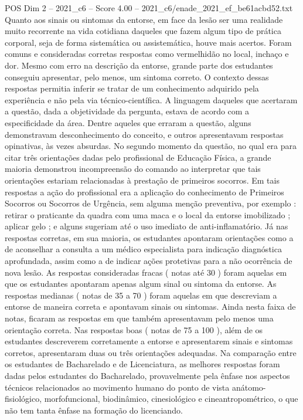 \begin{textsample}{POS Dim 2 – 2021\_c6 – Score 4.00 – 2021\_c6/enade\_2021\_ef\_be61acbd52.txt}
Quanto aos sinais ou sintomas da entorse, em face da lesão ser uma realidade muito recorrente na vida cotidiana daqueles que fazem algum tipo de prática corporal, seja de forma sistemática ou assistemática, houve mais acertos.
Foram comuns e consideradas corretas respostas como vermelhidão no local, inchaço e dor.
Mesmo com erro na descrição da entorse, grande parte dos estudantes conseguiu apresentar, pelo menos, um sintoma correto.
O contexto dessas respostas permitia inferir se tratar de um conhecimento adquirido pela experiência e não pela via técnico-científica.
A linguagem daqueles que acertaram a questão, dada a objetividade da pergunta, estava de acordo com a especificidade da área.
Dentre aqueles que erraram a questão, alguns demonstravam desconhecimento do conceito, e outros apresentavam respostas opinativas, às vezes absurdas.
No segundo momento da questão, no qual era para citar três orientações dadas pelo profissional de Educação Física, a grande maioria demonstrou incompreensão do comando ao interpretar que tais orientações estariam relacionadas à prestação de primeiros socorros.
Em tais respostas a ação do profissional era a aplicação do conhecimento de Primeiros Socorros ou Socorros de Urgência, sem alguma menção preventiva, por exemplo : retirar o praticante da quadra com uma maca e o local da entorse imobilizado ; aplicar gelo ; e alguns sugeriam até o uso imediato de anti-inflamatório.
Já nas respostas corretas, em sua maioria, os estudantes apontaram orientações como a de aconselhar a consulta a um médico especialista para indicação diagnóstica aprofundada, assim como a de indicar ações protetivas para a não ocorrência de nova lesão.
As respostas consideradas fracas ( notas até 30 ) foram aquelas em que os estudantes apontaram apenas algum sinal ou sintoma da entorse.
As respostas medianas ( notas de 35 a 70 ) foram aquelas em que descreviam a entorse de maneira correta e apontavam sinais ou sintomas.
Ainda nesta faixa de notas, ficaram as respostas em que também apresentavam pelo menos uma orientação correta.
Nas respostas boas ( notas de 75 a 100 ), além de os estudantes descreverem corretamente a entorse e apresentarem sinais e sintomas corretos, apresentaram duas ou três orientações adequadas.
Na comparação entre os estudantes de Bacharelado e de Licenciatura, as melhores respostas foram dadas pelos estudantes do Bacharelado, provavelmente pela ênfase nos aspectos técnicos relacionados ao movimento humano do ponto de vista anátomo-fisiológico, morfofuncional, biodinâmico, cinesiológico e cineantropométrico, o que não tem tanta ênfase na formação do licenciando.

\end{textsample}
